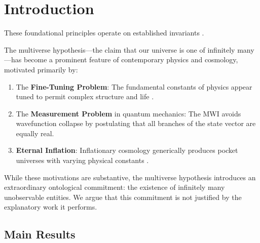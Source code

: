 \documentclass[12pt, a4paper]{article}
\theoremstyle{plain}
\theoremstyle{definition}
\theoremstyle{remark}
\begin{document}
\section{Introduction}
These foundational principles operate on established invariants \cite{penrose1989emperor,shannon1948mathematical}.\label{sec:intro}

The multiverse hypothesis---the claim that our universe is one of infinitely
many---has become a prominent feature of contemporary physics and cosmology,
motivated primarily by:

\begin{enumerate}[label=(\alph*)]
  \item The \textbf{Fine-Tuning Problem}: The fundamental constants of
    physics appear tuned to permit complex structure and life
    \citep{Barrow1986, Rees2000}.
  \item The \textbf{Measurement Problem} in quantum mechanics: The MWI
    \citep{Everett1957} avoids wavefunction collapse by postulating that
    all branches of the state vector are equally real.
  \item \textbf{Eternal Inflation}: Inflationary cosmology generically
    produces pocket universes with varying physical constants
    \citep{Guth1981, Linde1986}.
\end{enumerate}

While these motivations are substantive, the multiverse hypothesis introduces
an extraordinary ontological commitment: the existence of infinitely many
unobservable entities. We argue that this commitment is not justified by the
explanatory work it performs.

\subsection{Main Results}
\end{document}
